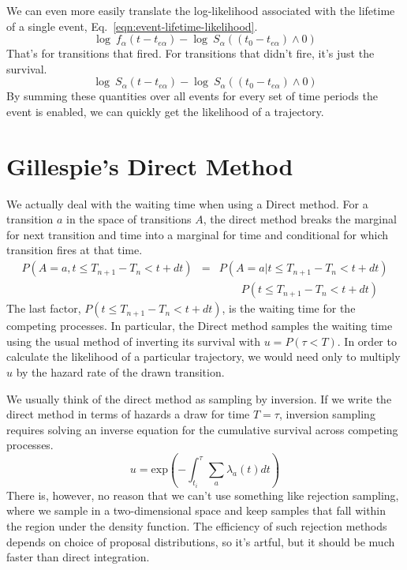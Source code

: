 \documentclass{article}
\begin{document}
We can even more easily translate the log-likelihood associated with the lifetime of a single event, Eq.~\ref{eqn:event-lifetime-likelihood}.
\begin{equation}
	\log\:f_\alpha(t-t_{e\alpha}) - \log\:S_\alpha((t_0-t_{e\alpha})\wedge 0)
\end{equation}
That's for transitions that fired. For transitions that didn't fire, it's just the survival.
\begin{equation}
	\log\:S_\alpha(t-t_{e\alpha}) - \log\:S_\alpha((t_0-t_{e\alpha})\wedge 0)
\end{equation}
By summing these quantities over all events for every set of time periods the event is enabled, we can quickly get the likelihood of a trajectory.

\section{Gillespie's Direct Method}

We actually deal with the waiting time when using a Direct method. For a transition $a$ in the space of transitions $A$, the direct method breaks the marginal for next transition and time into a marginal for time and conditional for which transition fires at that time.
\begin{eqnarray*}
	P(A=a, t\le T_{n+1}-T_n<t+dt) &=& P(A=a|t\le T_{n+1}-T_n<t+dt) \\
	& & \qquad P(t\le T_{n+1}-T_n<t+dt)
\end{eqnarray*}
The last factor, $P(t\le T_{n+1}-T_n<t+dt)$, is the waiting time for the competing processes. In particular, the Direct method samples the waiting time using the usual method of inverting its survival with $u=P(\tau<T)$. In order to calculate the likelihood of a particular trajectory, we would need only to multiply $u$ by the hazard rate of the drawn transition.

We usually think of the direct method as sampling by inversion. If we write the direct method in terms of hazards a draw for time $T=\tau$, inversion sampling requires solving an inverse equation for the cumulative survival across competing processes.
\begin{equation}
	u = \mbox{exp}\left(-\int_{t_i}^\tau\sum_a \lambda_a(t)dt\right)
\end{equation}
There is, however, no reason that we can't use something like rejection sampling, where we sample in a two-dimensional space and keep samples that fall within the region under the density function. The efficiency of such rejection methods depends on choice of proposal distributions, so it's artful, but it should be much faster than direct integration.
\end{document}
